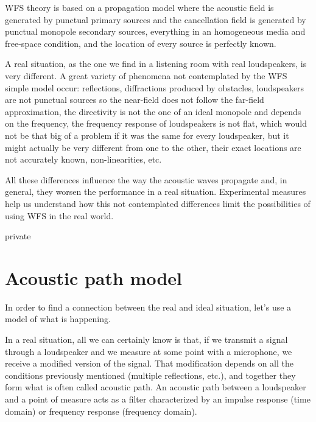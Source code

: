 WFS theory is based on a propagation model where the acoustic field is generated by punctual primary sources and the cancellation field is generated by punctual monopole secondary sources, everything in an homogeneous media and free-space condition, and the location of every source is perfectly known.

A real situation, as the one we find in a listening room with real loudspeakers, is very different. A great variety of phenomena not contemplated by the WFS simple model occur: reflections, diffractions produced by obstacles, loudspeakers are not punctual sources so the near-field does not follow the far-field approximation, the directivity is not the one of an ideal monopole and depends on the frequency, the frequency response of loudspeakers is not flat, which would not be that big of a problem if it was the same for every loudspeaker, but it might actually be very different from one to the other, their exact locations are not accurately known, non-linearities, etc.

All these differences influence the way the acoustic waves propagate and, in general, they worsen the performance in a real situation. Experimental measures help us understand how this not contemplated differences limit the possibilities of using WFS in the real world.
\begin{shownto}{private}
\section{Acoustic path model}
In order to find a connection between the real and ideal situation, let's use a model of what is happening.
\end{shownto}
In a real situation, all we can certainly know is that, if we transmit a signal through a loudspeaker and we measure at some point with a microphone, we receive a modified version of the signal. That modification depends on all the conditions previously mentioned (multiple reflections, etc.), and together they form what is often called acoustic path. An acoustic path between a loudspeaker and a point of measure acts as a filter characterized by an impulse response (time domain) or frequency response (frequency domain).

